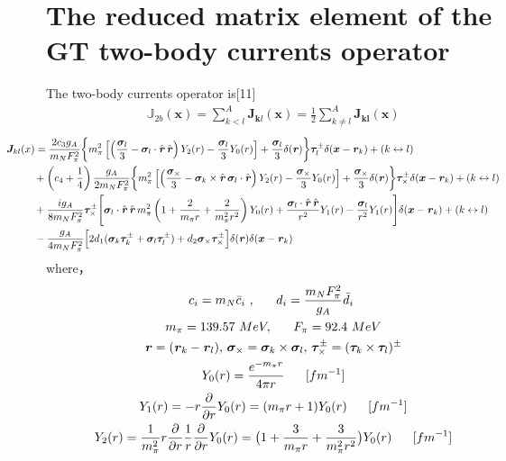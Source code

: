 \documentclass[master]{shnuthesis}
\newcommand{\bmr}{\textbf{\textit{r}}}
\newcommand{\il}{\!\!\!\!\!\!\!\!\!\!}
\newcommand{\ii}{\!\!\!\!\!\!\!\!\!\!\!\!\!\!\!\!\!\!\!\!}
\newcommand{\ol}{\,\,\,\,\,\,\,\,\,\,}
\begin{document}
\section{The reduced matrix element of the GT two-body currents operator}
The two-body currents operator is[11]
\begin{align}
    \mathbb{J}_{2 b}(\boldsymbol{x})=\sum_{k<l}^{A} \boldsymbol{J}_{\boldsymbol{k} l}(\boldsymbol{x})=\frac{1}{2} \sum_{k \neq l}^{A} \boldsymbol{J}_{\boldsymbol{k} \boldsymbol{l}}(\boldsymbol{x})
\end{align}
\begin{align}
    &\ii\!\!\! \bm{J}_{kl}(x) = \frac{2c_3g_A}{m_N F_{\pi}^2} \bigg\{ m_{\pi}^2 \left[ \left( \frac{\bm{\sigma}_l}{3} - \bm{\sigma}_l \cdot \hat{\bmr}\, \hat{\bmr} \right) Y_2(r) - \frac{\bm{\sigma}_l}{3} Y_0(r) \right] + \frac{\bm{\sigma}_l}{3} \delta(\bmr) \bigg\} \bm{\tau}_l^{\pm} \delta(\bm{x} - \bmr_k) + (k \leftrightarrow l) \notag \\
    &\il\!\!\! \quad + \left( c_4 + \frac{1}{4} \right) \frac{g_A}{2m_N F_{\pi}^2} \bigg\{ m_{\pi}^2 \left[ \left( \frac{\bm{\sigma}_\times}{3} - \bm{\sigma}_k \times \hat{\bmr}\, \bm{\sigma}_l \cdot \hat{\bmr} \right) Y_2(r) - \frac{\bm{\sigma}_\times}{3} Y_0(r) \right] + \frac{\bm{\sigma}_\times}{3} \delta(\bmr) \bigg\} \bm{\tau}_\times^{\pm} \delta(\bm{x} - \bmr_k) + (k \leftrightarrow l) \notag \\
    &\il\!\!\! \quad + \frac{ig_A}{8m_N F_{\pi}^2} \bm{\tau}_\times^{\pm} \Bigg[ \bm{\sigma}_l \cdot \hat{\bmr}\, \hat{\bmr} \, m_{\pi}^2 \left( 1 + \frac{2}{m_{\pi}r} + \frac{2}{m_{\pi}^2 r^2} \right) Y_0(r) + \frac{\bm{\sigma}_l \cdot \hat{\bmr}\,\hat{\bmr}}{r^2} Y_1(r) - \frac{\bm{\sigma}_l}{r^2} Y_1(r) \Bigg] \delta(\bm{x} - \bmr_k) + (k \leftrightarrow l) \notag \\
    &\il\!\!\! \quad - \frac{g_A}{4m_N F_{\pi}^2} \Big[ 2 d_1 (\bm{\sigma}_k \bm{\tau}_k^{\pm} + \bm{\sigma}_l \bm{\tau}_l^{\pm}) + d_2 \bm{\sigma}_\times \bm{\tau}_\times^{\pm} \Big] \delta(\bmr) \delta(\bm{x} - \bmr_k) 
\end{align}
where，
\begin{gather}
   c_i = m_N \bar{c}_i \,\,, \ol d_i = \frac{m_N F_\pi^2}{g_A} \bar{d}_i \,\, \\
   m_\pi = 139.57 \,\,MeV, \ol F_\pi = 92.4 \,\,MeV \\
   \bmr=(\bmr_k-\bmr_l),\, \bm{\sigma}_\times=\bm{\sigma}_k \times \bm{\sigma}_l,\, \bm{\tau}_\times^{\pm}=(\bm{\tau}_k \times \bm{\tau}_l)^{\pm} \\
   Y_0(r) = \frac{e^{-m_\pi r}}{4\pi r}\ol[fm^{-1}] \\
   Y_1(r) = -r\frac{\partial}{\partial r} Y_0(r) = (m_\pi r + 1) Y_0(r) \ol[fm^{-1}] \\
   Y_2(r) = \frac{1}{m_\pi^2} r \frac{\partial}{\partial r} \frac{1}{r} \frac{\partial}{\partial r} Y_0(r) = \big( 1 + \frac{3}{m_\pi r} +  \frac{3}{m_\pi^2 r^2} \big) Y_0(r) \ol[fm^{-1}]
\end{gather}
\end{document}
